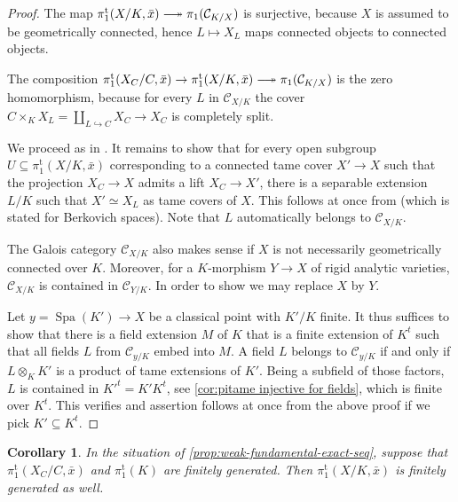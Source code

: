 \documentclass[a4paper,twoside,11pt,reqno]{amsart}
\newcommand{\cC}{{\mathcal C}}
\DeclareRobustCommand\longtwoheadrightarrow {\relbar\joinrel\twoheadrightarrow}
\newcommand{\surj}{\longtwoheadrightarrow}
\newcommand{\inj}{\hookrightarrow}
\DeclareMathOperator{\Spa}{Spa}
\newcommand{\pitame}{\pi_1^{\mathrm{t}}}
\newtheorem{cor}[thm]{Corollary}
\theoremstyle{definition}
\numberwithin{equation}{subsection}
\begin{document}
\begin{proof}
    The map $\pitame(X/K,\bar x) \surj \pi_1(\cC_{K/X})$ is surjective, because $X$ is assumed to be geometrically connected, hence $L \mapsto X_L$ maps connected objects to connected objects. 

    The composition $\pitame(X_C/C, \bar x) \to \pitame(X/K,\bar x) \surj \pi_1(\cC_{K/X})$ is the zero homomorphism, because for every $L$ in $\cC_{X/K}$ the cover $C \times_K X_L = \coprod_{L \inj C} X_C \to X_C$ is completely split. 

    We proceed as in \cite[X]{SGA1}. It remains to show that for every open subgroup $U \subseteq \pitame(X/K,\bar x)$ corresponding to a connected tame cover $X' \to X$ such that the projection  $X_C \to X$ admits a lift $X_C \to X'$, there is a separable extension $L/K$ such that $X' \simeq X_L$ as tame covers of $X$. This follows at once from
    \cite[Proposition~2.13]{deJong95:FundamentalGroupsofAnalytic}
    (which is stated for Berkovich spaces). Note that $L$ automatically belongs to $\cC_{X/K}$.
    
     The Galois category $\cC_{X/K}$ also makes sense if $X$ is not necessarily geometrically connected over $K$. Moreover, for a $K$-morphism $Y \to X$ of rigid analytic varieties, $\cC_{X/K}$ is contained in $\cC_{Y/K}$. In order to show  we may replace $X$ by $Y$.
    
    Let $y = \Spa(K') \to X$ be a classical point with $K'/K$ finite. It thus suffices to show that there is a field extension $M$ of $K$ that is a finite extension of $K^t$ such that all fields $L$ from $\cC_{y/K}$ embed into $M$. A field $L$ belongs to $\cC_{y/K}$ if and only if $L \otimes_K K'$ is a product of tame extensions of $K'$. Being a subfield of those factors, $L$ is contained in $K'^t = K' K^t$, see  \cref{cor:pitame injective for fields}, which is finite over $K^t$. This verifies  and assertion  follows at once from the above proof if we pick $K' \subseteq K^t$.     
\end{proof}

\begin{cor} \label{cor:fg-alg-closed}
    In the situation of \cref{prop:weak-fundamental-exact-seq}, suppose that $\pitame(X_C/C,\bar x)$ and $\pitame(K)$ are finitely generated. Then $\pitame(X/K,\bar x)$ is finitely generated as well.
\end{cor}
\end{document}
